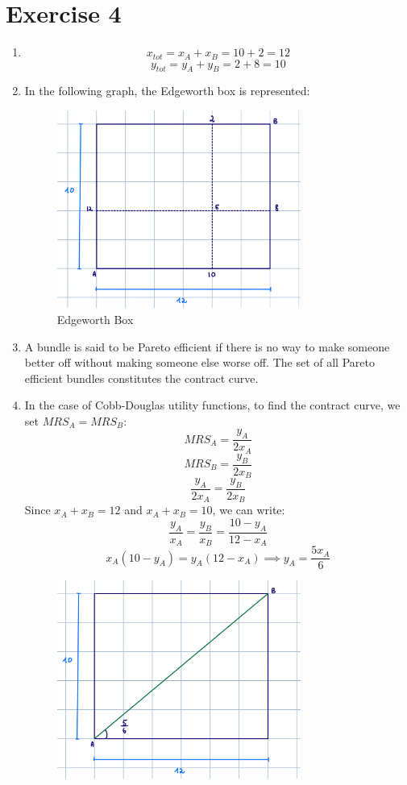 \documentclass{article}
\begin{document}
\section*{Exercise 4}
\begin{enumerate}[label=(\alph*)]
\item
\[x_{tot}= x_A+x_B=10+2=12\]
\[y_{tot}= y_A+y_B=2+8=10\]
\item In the following graph, the Edgeworth box is represented:
\begin{figure}[H]
    \centering
    \includegraphics[width=8cm]{fig4.png}
    \caption{Edgeworth Box}
    \label{fig:galaxy}
\end{figure}
\item A bundle is said to be Pareto efficient if there is no way to make someone better off without making someone else worse off. The set of all Pareto efficient bundles constitutes the contract curve.
\item In the case of Cobb-Douglas utility functions, to find the contract curve, we set $MRS_A=MRS_B$: 
\[ MRS_A= \frac{y_A}{2x_A} \]
\[ MRS_B= \frac{y_B}{2x_B}\]
\[\frac{y_A}{2x_A}=\frac{y_B}{2x_B}\]
Since $x_A+x_B=12$ and $x_A+x_B=10$, we can write:
\[\frac{y_A}{x_A}=\frac{y_B}{x_B}=\frac{10-y_A}{12-x_A}\]
\[x_A(10-y_A)=y_A(12-x_A) \implies y_A=\frac{5x_A}{6}\]
\begin{figure}[H]
    \centering
    \includegraphics[width=8cm]{fig5.png}

\end{figure}
\end{enumerate}
\end{document}
